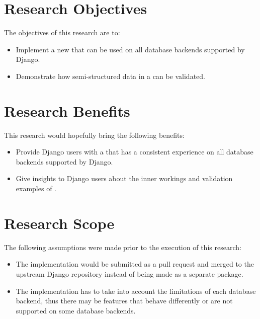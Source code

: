 \section{Research Objectives}

The objectives of this research are to:

\begin{itemize}
    \item Implement a new  that can be used on all database
          backends supported by Django.
    \item Demonstrate how semi-structured data in a  can be
          validated.
\end{itemize}

\section{Research Benefits}

This research would hopefully bring the following benefits:

\begin{itemize}
    \item Provide Django users with a  that has a consistent
          experience on all database backends supported by Django.
    \item Give insights to Django users about the inner workings and validation
          examples of .
\end{itemize}

\section{Research Scope}

The following assumptions were made prior to the execution of this research:

\begin{itemize}
    \item The  implementation would be submitted as a pull
          request and merged to the upstream Django repository instead of being
          made as a separate package.
    \item The  implementation has to take into account the
          limitations of each database backend, thus there may be features that
          behave differently or are not supported on some database backends.
\end{itemize}

